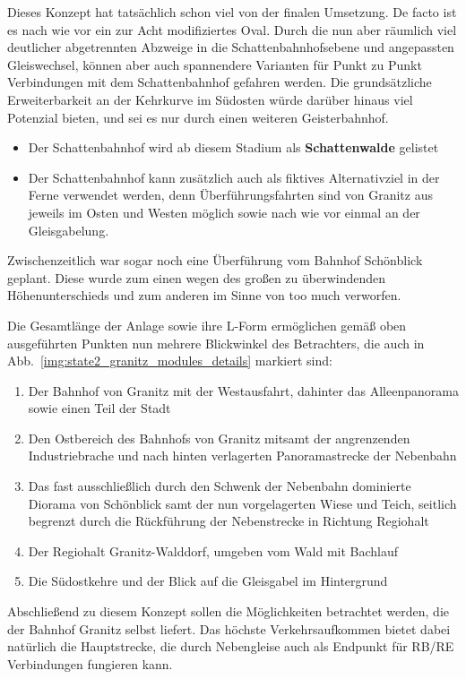 Dieses Konzept hat tats\"achlich schon viel von der finalen Umsetzung.
De facto ist es nach wie vor ein zur Acht modifiziertes Oval.
Durch die nun aber r\"aumlich viel deutlicher abgetrennten Abzweige in die Schattenbahnhofsebene und angepassten Gleiswechsel, k\"onnen aber auch spannendere Varianten f\"ur Punkt zu Punkt Verbindungen mit dem Schattenbahnhof gefahren werden.
Die grunds\"atzliche Erweiterbarkeit an der Kehrkurve im S\"udosten w\"urde dar\"uber hinaus viel Potenzial bieten, und sei es nur durch einen weiteren Geisterbahnhof.
\begin{itemize}
	\item Der Schattenbahnhof wird ab diesem Stadium als \textbf{Schattenwalde} gelistet
	\item Der Schattenbahnhof kann zus\"atzlich auch als fiktives Alternativziel in der Ferne verwendet werden, denn \"Uberf\"uhrungsfahrten sind von Granitz aus jeweils im Osten und Westen m\"oglich sowie nach wie vor einmal an der Gleisgabelung.
\end{itemize}
Zwischenzeitlich war sogar noch eine \"Uberf\"uhrung vom Bahnhof Sch\"onblick geplant.
Diese wurde zum einen wegen des gro{\ss}en zu \"uberwindenden H\"ohenunterschieds und zum anderen im Sinne von too much verworfen.

Die Gesamtl\"ange der Anlage sowie ihre L-Form erm\"oglichen gem\"a{\ss} oben ausgef\"uhrten Punkten nun mehrere Blickwinkel des Betrachters, die auch in Abb.~\ref{img:state2_granitz_modules_details} markiert sind:
\begin{enumerate}
	\item Der Bahnhof von Granitz mit der Westausfahrt, dahinter das Alleenpanorama sowie einen Teil der Stadt
	\item Den Ostbereich des Bahnhofs von Granitz mitsamt der angrenzenden Industriebrache und nach hinten verlagerten Panoramastrecke der Nebenbahn
	\item Das fast ausschlie{\ss}lich durch den Schwenk der Nebenbahn dominierte Diorama von Sch\"onblick samt der nun vorgelagerten Wiese und Teich, seitlich begrenzt durch die R\"uckf\"uhrung der Nebenstrecke in Richtung Regiohalt
	\item Der Regiohalt Granitz-Walddorf, umgeben vom Wald mit Bachlauf
	\item Die S\"udostkehre und der Blick auf die Gleisgabel im Hintergrund
\end{enumerate}

Abschlie{\ss}end zu diesem Konzept sollen die M\"oglichkeiten betrachtet werden, die der Bahnhof Granitz selbst liefert.
Das h\"ochste Verkehrsaufkommen bietet dabei nat\"urlich die Hauptstrecke, die durch Nebengleise auch als Endpunkt f\"ur RB/RE Verbindungen fungieren kann.

